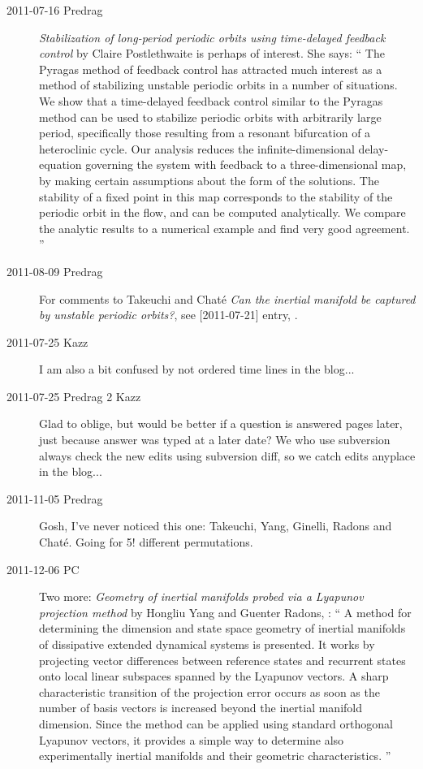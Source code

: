 \begin{description}
\item[2011-07-16 Predrag]
{\em Stabilization of long-period periodic orbits
    using time-delayed feedback control} by Claire
    Postlethwaite
is perhaps of interest. She says: ``
The Pyragas method of feedback control has attracted much interest as a
method of stabilizing unstable periodic orbits in a number of situations.
We show that a time-delayed feedback control similar to the Pyragas
method can be used to stabilize periodic orbits with arbitrarily large
period, specifically those resulting from a resonant bifurcation of a
heteroclinic cycle. Our analysis reduces the infinite-dimensional
delay-equation governing the system with feedback to a three-dimensional
map, by making certain assumptions about the form of the solutions. The
stability of a fixed point in this map corresponds to the stability of
the periodic orbit in the flow, and can be computed analytically. We
compare the analytic results to a numerical example and find very good
agreement.
''

\item[2011-08-09 Predrag] For comments to Takeuchi and Chat\'e
\emph{Can the inertial manifold be captured by unstable periodic
orbits?}, see [2011-07-21] entry, .

\item[2011-07-25 Kazz]
I am also a bit confused by not ordered time lines in the blog...

\item[2011-07-25 Predrag 2 Kazz]
Glad to oblige, but would be better if a question is answered pages
later, just because answer was typed at a later date? We who use subversion
always check the new edits using subversion diff, so we catch
edits anyplace in the blog...

\item[2011-11-05 Predrag] Gosh, I've never noticed this one:
Takeuchi, Yang, Ginelli, Radons and Chat\'{e}.
Going for 5! different permutations.

\item[2011-12-06 PC] Two more:
\emph{Geometry of inertial manifolds probed via a Lyapunov projection method}
by Hongliu Yang and Guenter Radons, :
``
A method for determining the dimension and state space geometry of
inertial manifolds of dissipative extended dynamical systems is
presented. It works by projecting vector differences between reference
states and recurrent states onto local linear subspaces spanned by the
Lyapunov vectors. A sharp characteristic transition of the projection
error occurs as soon as the number of basis vectors is increased beyond
the inertial manifold dimension. Since the method can be applied using
standard orthogonal Lyapunov vectors, it provides a simple way to
determine also experimentally inertial manifolds and their geometric
characteristics.
''


\end{description}
